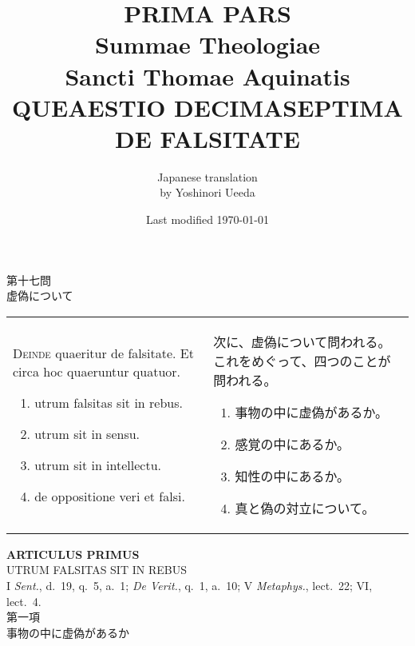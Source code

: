 \documentclass[10pt]{jsarticle} %
\title{{\bf PRIMA PARS}\\{\HUGE Summae Theologiae}\\Sancti Thomae
Aquinatis\\{\sffamily QUEAESTIO DECIMASEPTIMA}\\DE FALSITATE}
\author{Japanese translation\\by Yoshinori {\sc Ueeda}}
\date{Last modified \today}
\begin{document}
\maketitle
\pagestyle{fancy}

\begin{center}
{\Large 第十七問\\虚偽について}
\end{center}

\begin{longtable}{p{21em}p{21em}}

{\huge D}{\scshape einde} quaeritur de falsitate. Et circa hoc
 quaeruntur quatuor. 

\begin{enumerate}
 \item utrum falsitas sit in rebus.
 \item utrum sit in sensu.
 \item utrum sit in intellectu.
 \item de oppositione veri et falsi.
\end{enumerate}
 
&

次に、虚偽について問われる。これをめぐって、四つのことが問われる。
\begin{enumerate}
 \item 事物の中に虚偽があるか。
 \item 感覚の中にあるか。
 \item 知性の中にあるか。
 \item 真と偽の対立について。
\end{enumerate}


\end{longtable}

\newpage

\begin{center}
 {\Large {\bf ARTICULUS PRIMUS}}\\
 {\large UTRUM FALSITAS SIT IN REBUS}\\
 {\footnotesize I {\itshape Sent.}, d.~19, q.~5, a.~1; {\itshape De
 Verit.}, q.~1, a.~10; V {\itshape Metaphys.}, lect.~22; VI, lect.~4.}\\
 {\Large 第一項\\事物の中に虚偽があるか}
\end{center}
\end{document}
